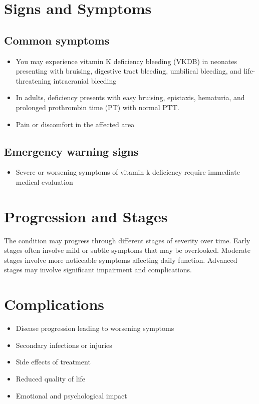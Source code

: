\section{Signs and Symptoms}
\subsection{Common symptoms}
\begin{itemize}[noitemsep]
  \item You may experience vitamin K deficiency bleeding (VKDB) in neonates presenting with bruising, digestive tract bleeding, umbilical bleeding, and life-threatening intracranial bleeding
  \item In adults, deficiency presents with easy bruising, epistaxis, hematuria, and prolonged prothrombin time (PT) with normal PTT.
  \item Pain or discomfort in the affected area
  \end{itemize}
\subsection{Emergency warning signs}
\begin{itemize}[noitemsep]
  \item Severe or worsening symptoms of vitamin k deficiency require immediate medical evaluation
\end{itemize}
\section{Progression and Stages}
The condition may progress through different stages of severity over time. Early stages often involve mild or subtle symptoms that may be overlooked. Moderate stages involve more noticeable symptoms affecting daily function. Advanced stages may involve significant impairment and complications.
\section{Complications}
\begin{itemize}[noitemsep]
  \item Disease progression leading to worsening symptoms
  \item Secondary infections or injuries
  \item Side effects of treatment
  \item Reduced quality of life
  \item Emotional and psychological impact
\end{itemize}
